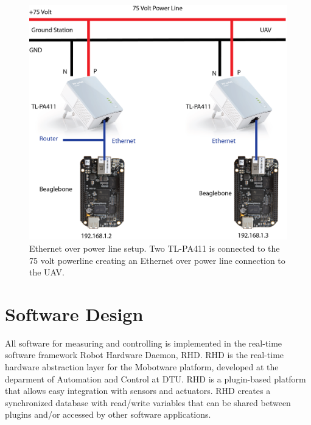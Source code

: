 \begin{figure}[hbtp]
\centering
\includegraphics[scale=0.75]{graphics/EthernetLink.png}
\caption[Ethernet over power line setup]{Ethernet over power line setup. Two TL-PA411 is connected to the 75 volt powerline creating an Ethernet over power line connection to the UAV.}
\label{fig:Networking}
\end{figure}



\section{Software Design}
All software for measuring and controlling is implemented in the real-time software framework Robot Hardware Daemon, RHD. RHD is the real-time hardware abstraction layer for the Mobotware platform, developed at the deparment of Automation and Control at DTU. RHD is a plugin-based platform that allows easy integration with sensors and actuators. RHD creates a synchronized database with read/write variables that can be shared between plugins and/or accessed by other software applications.

